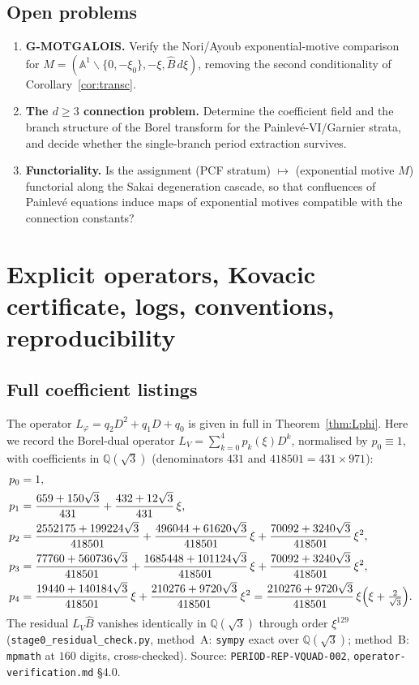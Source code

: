 \documentclass[11pt,reqno]{amsart}
\theoremstyle{plain}
\theoremstyle{definition}
\newcommand{\Bhat}{\widehat{B}}
\newcommand{\Lphi}{L_{\varphi}}
\newcommand{\LV}{L_{V}}
\newcommand{\Qsqrt}{\mathbb{Q}(\sqrt3)}
\newcommand{\xizero}{\xi_0}
\begin{document}
\subsection{Open problems}
\begin{enumerate}[leftmargin=1.6em,itemsep=2pt]
  \item \textbf{G-MOTGALOIS.} Verify the Nori/Ayoub exponential-motive comparison for
        $M=(\mathbb{A}^1\smallsetminus\{0,-\xizero\},-\xi,\Bhat\,d\xi)$, removing the second
        conditionality of Corollary~\ref{cor:transc}.
  \item \textbf{The $d\ge3$ connection problem.} Determine the coefficient field and the branch
        structure of the Borel transform for the Painlev\'e-VI/Garnier strata, and decide whether
        the single-branch period extraction survives.
  \item \textbf{Functoriality.} Is the assignment (PCF stratum) $\mapsto$ (exponential motive
        $M$) functorial along the Sakai degeneration cascade, so that confluences of Painlev\'e
        equations induce maps of exponential motives compatible with the connection constants?
\end{enumerate}

\appendix
\section{Explicit operators, Kovacic certificate, logs, conventions, reproducibility}\label{app:all}

\subsection{Full coefficient listings}\label{app:coeffs}
The operator $\Lphi=q_2D^2+q_1D+q_0$ is given in full in Theorem~\ref{thm:Lphi}. Here we record
the Borel-dual operator $\LV=\sum_{k=0}^4 p_k(\xi)D^k$, normalised by $p_0\equiv1$, with
coefficients in $\Qsqrt$ (denominators $431$ and $418501=431\times971$):
\begin{align*}
  p_0&=1,\\
  p_1&=\frac{659+150\sqrt3}{431}+\frac{432+12\sqrt3}{431}\,\xi,\\
  p_2&=\frac{2552175+199224\sqrt3}{418501}
       +\frac{496044+61620\sqrt3}{418501}\,\xi
       +\frac{70092+3240\sqrt3}{418501}\,\xi^2,\\
  p_3&=\frac{77760+560736\sqrt3}{418501}
       +\frac{1685448+101124\sqrt3}{418501}\,\xi
       +\frac{70092+3240\sqrt3}{418501}\,\xi^2,\\
  p_4&=\frac{19440+140184\sqrt3}{418501}\,\xi
       +\frac{210276+9720\sqrt3}{418501}\,\xi^2
       =\frac{210276+9720\sqrt3}{418501}\,\xi\Bigl(\xi+\tfrac{2}{\sqrt3}\Bigr).
\end{align*}
The residual $\LV\Bhat$ vanishes identically in $\Qsqrt$ through order $\xi^{129}$
(\texttt{stage0\_residual\_check.py}, method~A: \texttt{sympy} exact over $\Qsqrt$; method~B:
\texttt{mpmath} at $160$ digits, cross-checked). Source: \texttt{PERIOD-REP-VQUAD-002},
\texttt{operator-verification.md} \S4.0.
\end{document}
